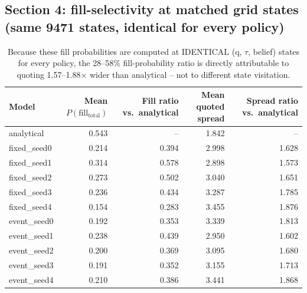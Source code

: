 \subsection*{Section 4: fill-selectivity at matched grid states (same 9471 states, identical for every policy)}
\begin{table}[h]
\centering
\small
\begin{tabular}{lrrrr}
\hline
Model & Mean $P(\text{fill}_\text{total})$ & Fill ratio vs.\ analytical & Mean quoted spread & Spread ratio vs.\ analytical \\
\hline
analytical    & 0.543 & --    & 1.842 & --    \\
fixed\_seed0  & 0.214 & 0.394 & 2.998 & 1.628 \\
fixed\_seed1  & 0.314 & 0.578 & 2.898 & 1.573 \\
fixed\_seed2  & 0.273 & 0.502 & 3.040 & 1.651 \\
fixed\_seed3  & 0.236 & 0.434 & 3.287 & 1.785 \\
fixed\_seed4  & 0.154 & 0.283 & 3.455 & 1.876 \\
event\_seed0  & 0.192 & 0.353 & 3.339 & 1.813 \\
event\_seed1  & 0.238 & 0.439 & 2.950 & 1.602 \\
event\_seed2  & 0.200 & 0.369 & 3.095 & 1.680 \\
event\_seed3  & 0.191 & 0.352 & 3.155 & 1.713 \\
event\_seed4  & 0.210 & 0.386 & 3.441 & 1.868 \\
\hline
\end{tabular}
\caption{Because these fill probabilities are computed at IDENTICAL (q, $\tau$, belief) states
for every policy, the 28--58\% fill-probability ratio is directly attributable to quoting
1.57--1.88$\times$ wider than analytical -- not to different state visitation.}
\end{table}

